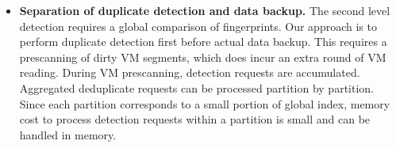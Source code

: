 \begin{itemize}


\item {\bf Separation of duplicate detection and data backup.}
The second level detection requires a global comparison of fingerprints.
Our approach is to perform duplicate detection first before actual data backup.
This requires a prescanning of  dirty VM segments, which
does incur an extra  round of VM reading.
During VM prescanning, detection requests are accumulated.
Aggregated deduplicate requests can be processed partition by partition. 
Since each partition corresponds to a small portion of global index, 
memory cost to process detection requests within a partition is small and can
be handled in memory.


\end{itemize}
